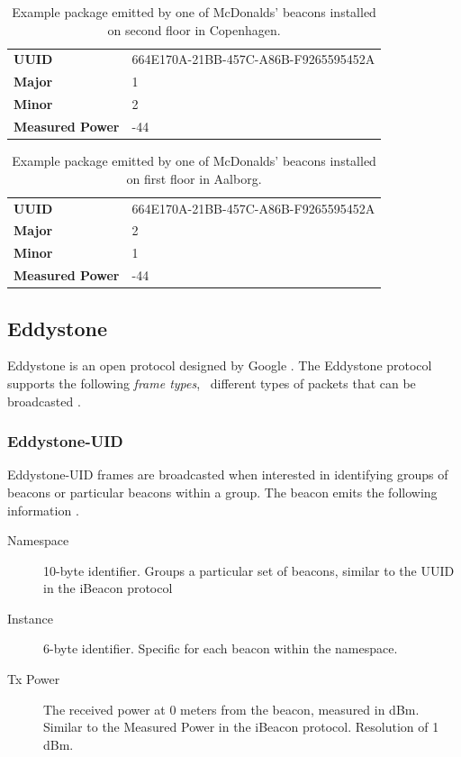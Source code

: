 \begin{table}[h!]
\centering
\caption{Example package emitted by one of McDonalds' beacons installed on second floor in Copenhagen.}
\label{tbl:design:ble-positioning:ibeacon2}
\begin{tabular}{ll}
\textbf{UUID}  & 664E170A-21BB-457C-A86B-F9265595452A \\
\textbf{Major} & 1                                    \\
\textbf{Minor} & 2           \\
\textbf{Measured Power} & -44                        
\end{tabular}
\end{table}

\begin{table}[h!]
\centering
\caption{Example package emitted by one of McDonalds' beacons installed on first floor in Aalborg.}
\label{tbl:design:ble-positioning:ibeacon3}
\begin{tabular}{ll}
\textbf{UUID}  & 664E170A-21BB-457C-A86B-F9265595452A \\
\textbf{Major} & 2                                    \\
\textbf{Minor} & 1            \\                        
\textbf{Measured Power} & -44
\end{tabular}
\end{table}

\subsection{Eddystone}

Eddystone is an open protocol designed by Google \cite{estimote:what-is-eddystone}. The Eddystone protocol supports the following \emph{frame types}, \ie~different types of packets that can be broadcasted \cite{eddystone:protocol-spec}.

\subsubsection{Eddystone-UID}

Eddystone-UID frames are broadcasted when interested in identifying groups of beacons or particular beacons within a group. The beacon emits the following information \cite{eddystone:protocol-uid-spec}.

\begin{description}
\item[Namespace] 10-byte identifier. Groups a particular set of beacons, similar to the UUID in the iBeacon protocol
\item[Instance] 6-byte identifier. Specific for each beacon within the namespace.
\item[Tx Power] The received power at 0 meters from the beacon, measured in dBm. Similar to the Measured Power in the iBeacon protocol. Resolution of 1 dBm.
\end{description}

